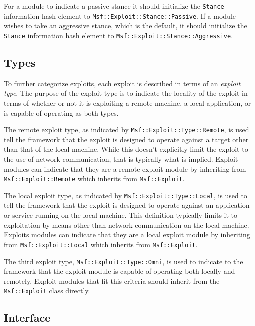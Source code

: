 \documentclass{report}
\begin{document}
\par
For a module to indicate a passive stance it should initialize the
\texttt{Stance} information hash element to
\texttt{Msf::Exploit::Stance::Passive}.  If a module wishes to take
an aggressive stance, which is the default, it should initialize the
\texttt{Stance} information hash element to
\texttt{Msf::Exploit::Stance::Aggressive}.

        \subsection{Types}

\par
To further categorize exploits, each exploit is described in terms
of an \textit{exploit type}.  The purpose of the exploit type is to
indicate the locality of the exploit in terms of whether or not it
is exploiting a remote machine, a local application, or is capable
of operating as both types.

\par
The remote exploit type, as indicated by
\texttt{Msf::Exploit::Type::Remote}, is used tell the framework that
the exploit is designed to operate against a target other than that
of the local machine.  While this doesn't explicitly limit the
exploit to the use of network communication, that is typically what
is implied.  Exploit modules can indicate that they are a remote
exploit module by inheriting from \texttt{Msf::Exploit::Remote}
which inherits from \texttt{Msf::Exploit}.

\par
The local exploit type, as indicated by
\texttt{Msf::Exploit::Type::Local}, is used to tell the framework
that the exploit is designed to operate against an application or
service running on the local machine.  This definition typically
limits it to exploitation by means other than network communication
on the local machine.  Exploits modules can indicate that they are a
local exploit module by inheriting from \texttt{Msf::Exploit::Local}
which inherits from \texttt{Msf::Exploit}.

\par
The third exploit type, \texttt{Msf::Exploit::Type::Omni}, is used
to indicate to the framework that the exploit module is capable of
operating both locally and remotely.  Exploit modules that fit this
criteria should inherit from the \texttt{Msf::Exploit} class
directly.

        \subsection{Interface}
\end{document}
